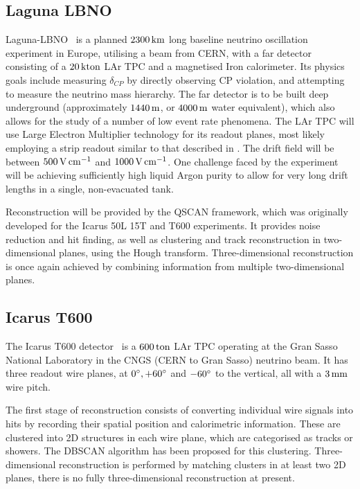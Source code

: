 \subsection{Laguna LBNO}
Laguna-LBNO~\citep{Laguna} is a planned $2300\km$ long baseline neutrino oscillation experiment in Europe, utilising a beam from CERN, with a far detector consisting of a $20\kton$ \acs{LAr TPC} and a magnetised Iron calorimeter. Its physics goals include measuring $\delta_{CP}$ by directly observing CP violation, and attempting to measure the neutrino mass hierarchy. The far detector is to be built deep underground (approximately $1440\metre$, or $4000\metre$ water equivalent), which also allows for the study of a number of low event rate phenomena. The \acs{LAr TPC} will use Large Electron Multiplier technology for its readout planes, most likely employing a strip readout similar to that described in \citep{Badertscher2012}. The drift field will be between $500\volt\cm^{-1}$ and $1000\volt\cm^{-1}$. One challenge faced by the experiment will be achieving sufficiently high liquid Argon purity to allow for very long drift lengths in a single, non-evacuated tank.

Reconstruction will be provided by the QSCAN framework, which was originally developed for the Icarus 50L 15T and T600 experiments. It provides noise reduction and hit finding, as well as clustering and track reconstruction in two-dimensional planes, using the Hough transform. Three-dimensional reconstruction is once again achieved by combining information from multiple two-dimensional planes.

\subsection{Icarus T600}
The Icarus T600 detector~\citep{Icarus2013} is a $600\ton$ \acs{LAr TPC} operating at the Gran Sasso National Laboratory in the CNGS (CERN to Gran Sasso) neutrino beam. It has three readout wire planes, at $0\degree, +60\degree$ and $-60\degree$ to the vertical, all with a $3\mm$ wire pitch.

The first stage of reconstruction consists of converting individual wire signals into hits by recording their spatial position and calorimetric information. These are clustered into 2D structures in each wire plane, which are categorised as tracks or showers. The DBSCAN algorithm has been proposed for this clustering. Three-dimensional reconstruction is performed by matching clusters in at least two 2D planes, there is no fully three-dimensional reconstruction at present.

